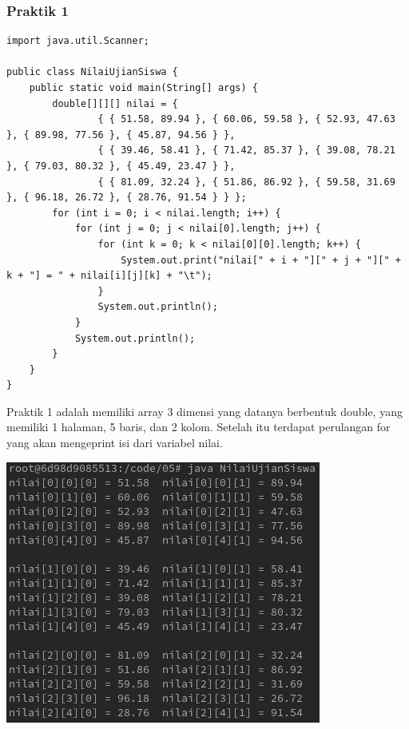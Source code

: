 \documentclass[a4paper,12pt]{article}
\begin{document}
\subsubsection{Praktik 1}
\begin{lstlisting}
import java.util.Scanner;

public class NilaiUjianSiswa {
    public static void main(String[] args) {
        double[][][] nilai = {
                { { 51.58, 89.94 }, { 60.06, 59.58 }, { 52.93, 47.63 }, { 89.98, 77.56 }, { 45.87, 94.56 } },
                { { 39.46, 58.41 }, { 71.42, 85.37 }, { 39.08, 78.21 }, { 79.03, 80.32 }, { 45.49, 23.47 } },
                { { 81.09, 32.24 }, { 51.86, 86.92 }, { 59.58, 31.69 }, { 96.18, 26.72 }, { 28.76, 91.54 } } };
        for (int i = 0; i < nilai.length; i++) {
            for (int j = 0; j < nilai[0].length; j++) {
                for (int k = 0; k < nilai[0][0].length; k++) {
                    System.out.print("nilai[" + i + "][" + j + "][" + k + "] = " + nilai[i][j][k] + "\t");
                }
                System.out.println();
            }
            System.out.println();
        }
    }
}
\end{lstlisting}
Praktik 1 adalah memiliki array 3 dimensi yang datanya berbentuk double, yang memiliki 1 halaman, 5 baris, dan 2 kolom. Setelah itu terdapat perulangan for
yang akan mengeprint isi dari variabel nilai.
\begin{center}
    \includegraphics[scale=.8]{1.png}
\end{center}
\end{document}
